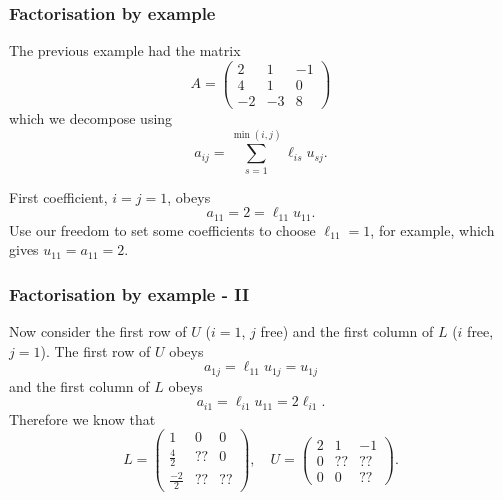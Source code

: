 \documentclass{beamer}
\begin{document}
\begin{frame}
  \frametitle{Factorisation by example}
  
  The previous example had the matrix
  \begin{equation*}
    A =
    \begin{pmatrix}
      2 & 1 & -1 \\
      4 & 1 & 0 \\
      -2 & -3 & 8
    \end{pmatrix}
  \end{equation*}
  which we decompose using
  \begin{equation*}
    a_{i j} = \sum_{s=1}^{\min(i, j)} \ell_{i s} u_{s j}.
  \end{equation*} \pause

  First coefficient, $i = j = 1$, obeys
  \begin{equation*}
    a_{1 1}  = 2 = \ell_{1 1} u_{1 1}.
  \end{equation*}
  Use our freedom to set some coefficients to choose $\ell_{1
    1} = 1$, for example, which gives $u_{1 1} = a_{1 1} = 2$.

\end{frame}

\begin{frame}
  \frametitle{Factorisation by example - II}

  Now consider the first row of $U$ ($i = 1$, $j$ free) and the first
  column of $L$ ($i$ free, $j = 1$). The first row of $U$ obeys
  \begin{equation*}
    a_{1 j} = \ell_{1 1} u_{1 j} = u_{1 j}
  \end{equation*}
  and the first column of $L$ obeys
  \begin{equation*}
    a_{i 1} = \ell_{i 1} u_{1 1} = 2 \ell_{i 1}.
  \end{equation*}
  Therefore we know that
  \begin{equation*}
    L =
    \begin{pmatrix}
      1 & 0 & 0 \\
      \tfrac{4}{2} & ?? & 0 \\
      \tfrac{-2}{2} & ?? & ??
    \end{pmatrix}, \quad
    U =
    \begin{pmatrix}
      2 & 1 & -1 \\
      0 & ?? & ?? \\
      0 & 0 & ??
    \end{pmatrix}.
  \end{equation*}


\end{frame}
\end{document}
